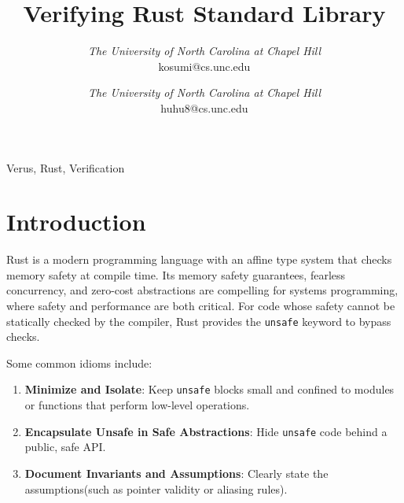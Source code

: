\documentclass[conference]{IEEEtran}
\begin{document}
\title{Verifying Rust Standard Library}

\author{
\textit{The University of North Carolina at
Chapel Hill}\\
kosumi@cs.unc.edu
\and
{}
\textit{The University of North Carolina at
Chapel Hill}\\
huhu8@cs.unc.edu}
\maketitle


\begin{IEEEkeywords}
Verus, Rust, Verification 
\end{IEEEkeywords}

\section{Introduction}
Rust\cite{matsakis2014rust} is a modern programming language with an affine type system that checks memory safety at compile time. Its memory safety guarantees, fearless concurrency, and zero-cost abstractions are compelling for systems programming, where safety and performance are both critical. For code whose safety cannot be statically checked by the compiler, Rust provides the \texttt{unsafe} keyword to bypass checks. 


Some common idioms include:
\begin{enumerate}
    \item \textbf{Minimize and Isolate}: Keep \texttt{unsafe} blocks small and confined to modules or functions that perform low-level operations. 
    \item \textbf{Encapsulate Unsafe in Safe Abstractions}: Hide \texttt{unsafe} code behind a public, safe API. 
    \item \textbf{Document Invariants and Assumptions}: Clearly state the assumptions(such as pointer validity or aliasing rules). 
\end{enumerate}
\end{document}
